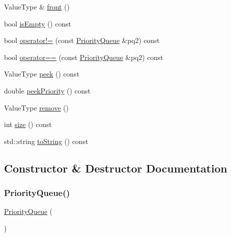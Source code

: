 \begin{DoxyCompactItemize}
\item 
Value\+Type \& \mbox{\hyperlink{classPriorityQueue_a736a6bda35a26620407e175bee46ae4a}{front}} ()
\item 
bool \mbox{\hyperlink{classPriorityQueue_acf82f9b2937375c7b1cf3dccb3df3312}{is\+Empty}} () const
\item 
bool \mbox{\hyperlink{classPriorityQueue_ae558f5c7424d82899a0872c8703e2445}{operator!=}} (const \mbox{\hyperlink{classPriorityQueue}{Priority\+Queue}} \&pq2) const
\item 
bool \mbox{\hyperlink{classPriorityQueue_ab32c20704a0dbe581c0a666156fa057a}{operator==}} (const \mbox{\hyperlink{classPriorityQueue}{Priority\+Queue}} \&pq2) const
\item 
Value\+Type \mbox{\hyperlink{classPriorityQueue_a7fcf31135d35acfa8ab1174c44bf28f3}{peek}} () const
\item 
double \mbox{\hyperlink{classPriorityQueue_ad3fce2f9d785c3232def3482817ec1c6}{peek\+Priority}} () const
\item 
Value\+Type \mbox{\hyperlink{classPriorityQueue_a025ec97fa5b04552f5ad0902c1f02ac1}{remove}} ()
\item 
int \mbox{\hyperlink{classPriorityQueue_af9593d4a5ff4274efaf429cb4f9e57cc}{size}} () const
\item 
std\+::string \mbox{\hyperlink{classPriorityQueue_a1fe5121d6528fdea3f243321b3fa3a49}{to\+String}} () const
\end{DoxyCompactItemize}


\subsection{Constructor \& Destructor Documentation}
\mbox{\label{classPriorityQueue_abc81897aed19eefcf321dcb7e12b166d}} 
\subsubsection{\texorpdfstring{Priority\+Queue()}{PriorityQueue()}\hspace{0.1cm}{\footnotesize\ttfamily [1/2]}}
{\footnotesize\ttfamily \mbox{\hyperlink{classPriorityQueue}{Priority\+Queue}} (\begin{DoxyParamCaption}{ }\end{DoxyParamCaption})}

